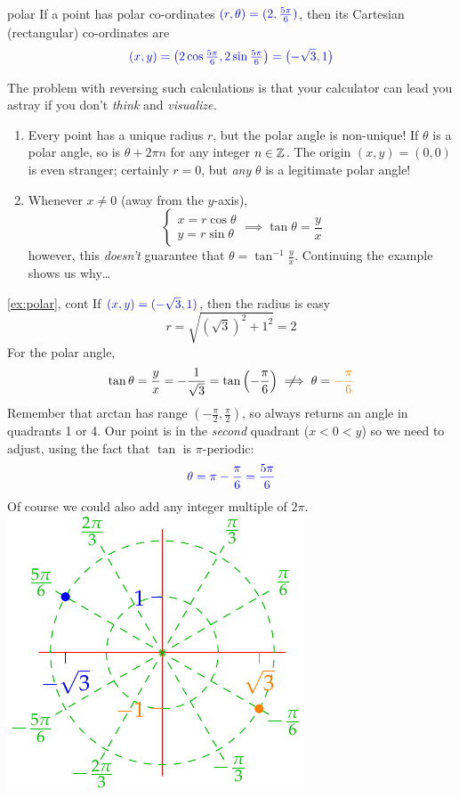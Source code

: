 \begin{example}{}{polar}
If a point has polar co-ordinates $\textcolor{blue}{(r,\theta)=(2,\frac{5\pi}6)}$, then its Cartesian (rectangular) co-ordinates are
\[\textcolor{blue}{(x,y)=\bigl(2\cos\tfrac{5\pi}6,2\sin\tfrac{5\pi}6\bigr) =\bigl(-\sqrt 3,1\bigr)}\]
\end{example}

The problem with reversing such calculations is that your calculator can lead you astray if you don't \emph{think} and \emph{visualize.}  
\begin{enumerate}
  \item Every point has a unique radius $r$, but the polar angle is non-unique! If $\theta$ is a polar angle, so is $\theta+2\pi n$ for any integer $n\in\mathbb{Z}$. The origin $(x,y)=(0,0)$ is even stranger; certainly $r=0$, but \emph{any} $\theta$ is a legitimate polar angle!
  \item Whenever $x\neq 0$ (away from the $y$-axis),
  \[\begin{cases}
  x=r\cos\theta\\
  y=r\sin\theta
  \end{cases}\implies \tan\theta=\frac yx\]
	however, this \emph{doesn't} guarantee that $\theta=\tan^{-1}\frac yx$. Continuing the example shows us why\ldots
\end{enumerate}

\begin{example*}[lower separated=false, sidebyside, sidebyside align=top seam, sidebyside gap=0pt, righthand width=0.35\linewidth]{\ref{ex:polar}, cont}{}
If $\textcolor{blue}{(x,y)=(-\sqrt 3,1)}$, then the radius is easy
\[r=\sqrt{(\sqrt 3)^2+1^2}=2\]
For the polar angle,
\[\tan\theta=\frac yx=-\frac 1{\sqrt 3}=\tan\left(-\frac\pi 6\right)\notimplies \theta=\textcolor{orange}{-\frac\pi 6}\]
Remember that arctan has range $(-\frac\pi 2,\frac\pi 2)$, so always returns an angle in quadrants 1 or 4. Our point is in the \emph{second} quadrant ($x<0<y$) so we need to adjust, using the fact that $\tan$ is $\pi$-periodic:
\[\textcolor{blue}{\theta=\pi-\frac\pi 6=\frac{5\pi}6}\]
Of course we could also add any integer multiple of $2\pi$.
\tcblower
\flushright\includegraphics{expolar}
\end{example*}


